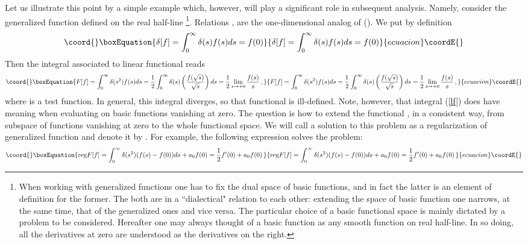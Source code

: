 \documentclass[a4paper,12pt]{article}
\begin{document}
Let us illustrate this point by a simple example which, however, will play a
significant role in subsequent analysis. Namely, consider the generalized
function \coordHE{} defined on the real half-line \coordHE{}
\footnote{%
When working with generalized functions one has to fix the dual space of
basic functions, and in fact the latter is an element of definition for the
former. The both are in a ``dialectical" relation to each other: extending
the space of basic function one narrows, at the same time, that of the
generalized ones and vice versa. The particular choice of a basic functional
space is mainly dictated by a problem to be considered. Hereafter one may
always thought of a basic function as any smooth function on real half-line.
In so doing, all the derivatives at zero are understood as the derivatives
on the right.}. Relations \coordHE{}, \coordHE{} are the one-dimensional analog of (\myHighlight{$%
\ref{lc}$}\coordHE{}). We put by definition
\begin{equation}\coord{}\boxEquation{  \label{def}
\delta[f]=\int_0^{\infty}\delta(s)f(s)ds=f(0)
}{  \delta[f]=\int_0^{\infty}\delta(s)f(s)ds=f(0)
}{ecuacion}\coordE{}\end{equation}
Then the integral associated to linear functional \coordHE{} reads
\begin{equation}\coord{}\boxEquation{  \label{lf}
F[f]=\int_{0}^{\infty} \delta (s^2)f(s)ds=\frac{1}2\int_0^{\infty}
\delta(s)\left(\frac{f(\sqrt{s})} {\sqrt{s}}\right)ds=\frac{1}
2\lim_{s\rightarrow +0}\frac{f(s)}{s}\,,
}{  F[f]=\int_{0}^{\infty} \delta (s^2)f(s)ds=\frac{1}2\int_0^{\infty}
\delta(s)\left(\frac{f(\sqrt{s})} {\sqrt{s}}\right)ds=\frac{1}
2\lim_{s\rightarrow +0}\frac{f(s)}{s}\,,
}{ecuacion}\coordE{}\end{equation}
where \coordHE{} is a test function. In general, this integral diverges, so that
functional \coordHE{} is ill-defined. Note, however, that integral (\ref{lf}) does
have meaning when evaluating on basic functions vanishing at zero. The
question is how to extend the functional \coordHE{}, in a consistent way, from
subspace of functions vanishing at zero to the whole functional space. We
will call a solution to this problem as a regularization of generalized
function \coordHE{} and denote it by \coordHE{}. For example, the
following expression solves the problem:
\begin{equation}\coord{}\boxEquation{  \label{reg}
\text{reg} F[f]=\int_{0}^{\infty } \delta(s^2)(f(s)-f(0))ds + a_0f(0)=\frac
12f^{\prime}(0)+a_0f(0)\,
}{  \text{reg} F[f]=\int_{0}^{\infty } \delta(s^2)(f(s)-f(0))ds + a_0f(0)=\frac
12f^{\prime}(0)+a_0f(0)\,
}{ecuacion}\coordE{}\end{equation}
\end{document}
